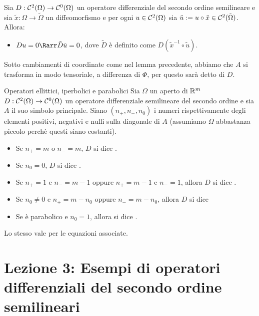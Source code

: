 \documentclass{article}
\begin{document}
\begin{lemma}{}{}
    Sia $D:\mathcal{C}^2(\Omega)\to\mathcal{C}^0(\Omega)$ un operatore differenziale del secondo ordine semilineare e sia $\tilde{x} : \Omega \to \tilde{\Omega}$ un diffeomorfismo e per ogni $u \in \mathcal{C}^2(\Omega)$ sia $\tilde{u} := u\circ \tilde{x} \in \mathcal{C}^2(\tilde{\Omega})$. Allora:\begin{itemize}
        \item $Du = 0 \Rarr \tilde{D}\tilde{u} = 0$, dove $\tilde{D}$ è definito come $D(\tilde{x}^{-1}\circ \tilde{u})$.
    \end{itemize}
\end{lemma}

\begin{remark}{}{}
    Sotto cambiamenti di coordinate come nel lemma precedente, abbiamo che $A$ si trasforma in modo tensoriale, a differenza di $\Phi$, per questo sarà detto  di $D$.
\end{remark}

\begin{definition}{Operatori ellittici, iperbolici e parabolici}{}
    Sia $\Omega$ un aperto di $\mathbb{R}^m$ $D:\mathcal{C}^2(\Omega)\to\mathcal{C}^0(\Omega)$ un operatore differenziale semilineare del secondo ordine e sia $A$ il suo simbolo principale. Siano $(n_+,n_-,n_0)$ i numeri rispettivamente degli elementi positivi, negativi e nulli sulla diagonale di $A$ (assumiamo $\Omega$ abbastanza piccolo perchè questi siano costanti).\begin{itemize}
        \item Se $n_+ = m$ o $n_- = m$, $D$ si dice .
        \item Se $n_0=0$, $D$ si dice .
        \item Se $n_+ = 1$ e $n_- = m-1$ oppure $n_+ = m-1$ e $n_- = 1$, allora $D$ si dice .
        \item Se $n_0 \neq 0$ e $n_+ = m-n_0$ oppure $n_- = m-n_0$, allora $D$ si dice 
        \item Se è parabolico e $n_0 = 1$, allora si dice .
    \end{itemize}
    Lo stesso vale per le equazioni associate.
\end{definition}

\section{Lezione 3: Esempi di operatori differenziali del secondo ordine semilineari}
\end{document}
